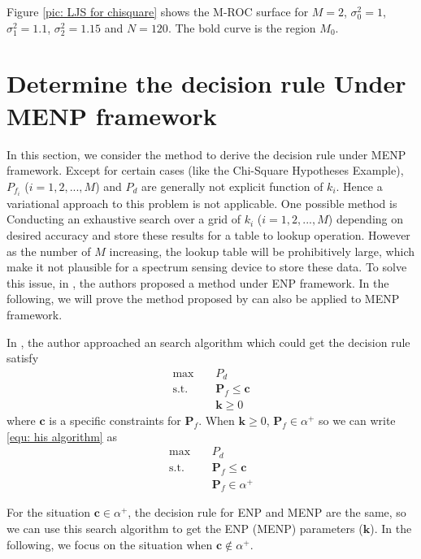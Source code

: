 \documentclass[12pt,journal,a4paper,twoside,onecolumn]{IEEEtran}
\begin{document}
\begin{spacing}{2.5}
Figure \ref{pic: LJS for chisquare} shows the M-ROC surface for $M=2$, $\sigma_0^2 = 1$, $\sigma_1^2 = 1.1$, $\sigma_2^2 = 1.15$ and $N=120$. The bold curve is the region $M_0$. 

\section{Determine the decision rule Under MENP framework}
In this section, we consider the method to derive the decision rule under MENP framework. Except for certain cases (like the Chi-Square Hypotheses Example), $P_{f_i}$ ($i = 1, 2, ..., M$) and $P_d$ are generally not explicit function of $k_i$. Hence a variational approach to this problem is not applicable. One possible method is Conducting an exhaustive search over a grid of $k_i$ ($i = 1, 2, ..., M$) depending on desired accuracy and store these results for a table to lookup operation. However as the number of $M$ increasing, the lookup table will be prohibitively large, which make it not plausible for a spectrum sensing device to store these data. To solve this issue, in \cite{zhang1999desig}, the authors proposed a method under ENP framework. In the following, we will prove the method proposed by \cite{zhang1999desig} can also be applied to MENP framework.

In \cite{zhang1999desig}, the author approached an search algorithm which could get the decision rule satisfy
\begin{equation}
\begin{split}
\label{equ: his algorithm}
\max\;\;\;\;&P_d\\
\text{s.t.}\;\;\;\;&\mathbf{P}_f \leq \mathbf{c}\\
&\mathbf{k} \geq  0
\end{split}
\end{equation}
where $\mathbf{c}$ is a specific constraints for $\mathbf{P}_f$.
When $\mathbf{k} \geq 0$, $\mathbf{P}_f \in \alpha^+$ so we can write \eqref{equ: his algorithm} as 
\begin{equation}
\begin{split}
\label{equ: his algorithm}
\max\;\;\;\;&P_d\\
\text{s.t.}\;\;\;\;&\mathbf{P}_f \leq \mathbf{c}\\
&\mathbf{P}_f \in \alpha^+
\end{split}
\end{equation}

For the situation $\mathbf{c} \in \alpha^+$, the decision rule for ENP and MENP are the same, so we can use this search algorithm to get the ENP (MENP) parameters ($\mathbf{k}$). In the following, we focus on the situation when $\mathbf{c} \notin \alpha^+$. 


\end{spacing}
\end{document}
